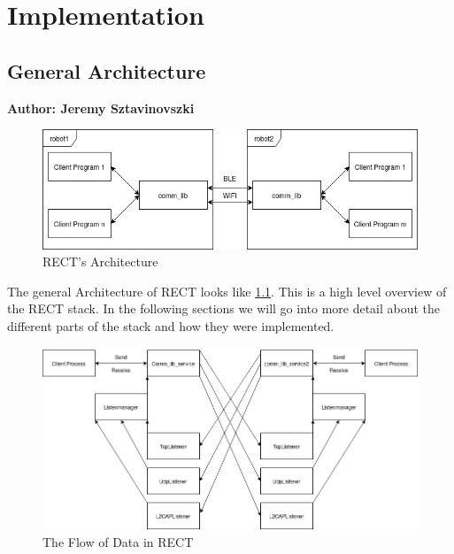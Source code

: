 \chapter{Implementation}

\section{General Architecture}
\textbf{Author: Jeremy Sztavinovszki}
\begin{figure}
	\centering

	\includegraphics[width=\textwidth]{img/RECT-Architecture}
	
	\caption{RECT's Architecture}
	\label{fig:rect-architecture}
\end{figure}

The general Architecture of RECT looks like \ref{fig:rect-architecture}. This is a high level overview of the RECT stack.
In the following sections we will go into more detail about the different parts of the stack and how they were implemented.

\begin{figure}
	\centering

	\includegraphics[width=\textwidth]{img/RECT-dataflow}

	\caption{The Flow of Data in RECT}
	\label{fig:rect-dataflow}

\end{figure}

